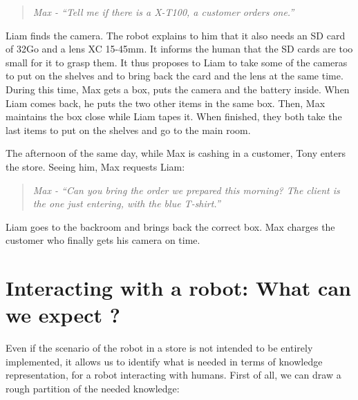 \begin{quote} 
\centering 
\textit{
Max - ``Tell me if there is a X-T100, a customer orders one.''}
\end{quote}

Liam finds the camera. The robot explains to him that it also needs an SD card of 32Go and a lens XC 15-45mm. It informs the human that the SD cards are too small for it to grasp them. It thus proposes to Liam to take some of the cameras to put on the shelves and to bring back the card and the lens at the same time. During this time, Max gets a box, puts the camera and the battery inside. When Liam comes back, he puts the two other items in the same box. Then, Max maintains the box close while Liam tapes it. When finished, they both take the last items to put on the shelves and go to the main room.

The afternoon of the same day, while Max is cashing in a customer, Tony enters the store. Seeing him, Max requests Liam:

\begin{quote} 
\centering 
\textit{
Max - ``Can you bring the order we prepared this morning? The client is the one just entering, with the blue T-shirt.''}
\end{quote}

Liam goes to the backroom and brings back the correct box. Max charges the customer who finally gets his camera on time.

\section{Interacting with a robot: What can we expect ?}

Even if the scenario of the robot in a store is not intended to be entirely implemented, it allows us to identify what is needed in terms of knowledge representation, for a robot interacting with humans. First of all, we can draw a rough partition of the needed knowledge:

